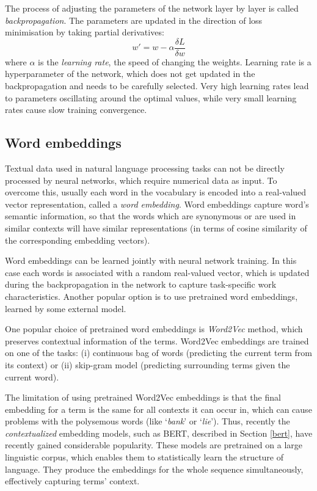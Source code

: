 The process of adjusting the parameters of the network layer by layer is called \textit{backpropagation}. The parameters are updated in the direction of loss minimisation by taking partial derivatives:
\begin{equation}
    w' = w - \alpha\frac{\delta L}{\delta w}
\end{equation}
where $\alpha$ is the \textit{learning rate}, the speed of changing the weights. Learning rate is a hyperparameter of the network, which does not get updated in the backpropagation and needs to be carefully selected. Very high learning rates lead to parameters oscillating around the optimal values, while very small learning rates cause slow training convergence.

\subsection{Word embeddings}

Textual data used in natural language processing tasks can not be directly processed by neural networks, which require numerical data as input. To overcome this, usually each word in the vocabulary is encoded into a real-valued vector representation, called a \textit{word embedding}. Word embeddings capture word's semantic information, so that the words which are synonymous or are used in similar contexts will have similar representations (in terms of cosine similarity of the corresponding embedding vectors).

Word embeddings can be learned jointly with neural network training. In this case each words is associated with a random real-valued vector, which is updated during the backpropagation in the network to capture task-specific work characteristics. Another popular option is to use pretrained word embeddings, learned by some external model.

One popular choice of pretrained word embeddings is \textit{Word2Vec} \cite{mikolov2013efficient} method, which preserves contextual information of the terms. Word2Vec embeddings are trained on one of the tasks: (i) continuous bag of words (predicting the current term from its context) or (ii) skip-gram model (predicting surrounding terms given the current word). 

The limitation of using pretrained Word2Vec embeddings is that the final embedding for a term is the same for all contexts it can occur in, which can cause problems with the polysemous words (like `\textit{bank}' or `\textit{lie}'). Thus, recently the \textit{contextualized} embedding models, such as BERT, described in Section \ref{bert}, have recently gained considerable popularity. These models are pretrained on a large linguistic corpus, which enables them to statistically learn the structure of language. They produce the embeddings for the whole sequence simultaneously, effectively capturing terms' context. 

